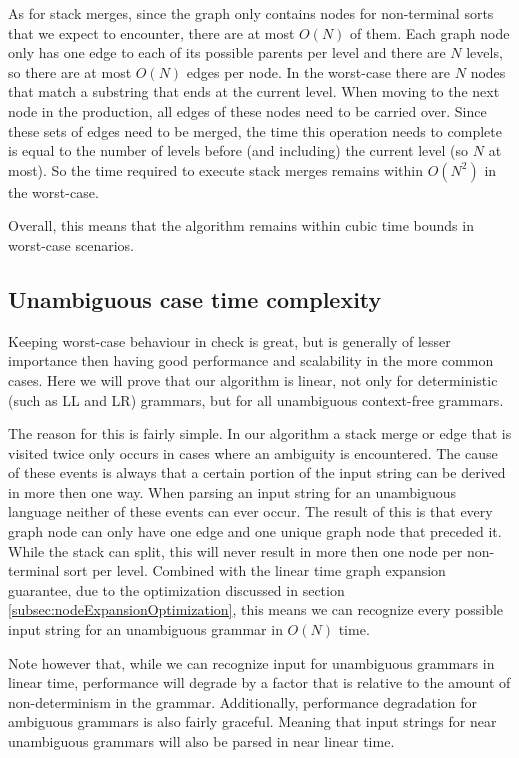 \documentclass[a4paper,10pt]{article}
\begin{document}
As for stack merges, since the graph only contains nodes for non-terminal sorts that we expect to encounter, there are at most $O(N)$ of them. Each graph node only has one edge to each of its possible parents per level and there are $N$ levels, so there are at most $O(N)$ edges per node. In the worst-case there are $N$ nodes that match a substring that ends at the current level. When moving to the next node in the production, all edges of these nodes need to be carried over. Since these sets of edges need to be merged, the time this operation needs to complete is equal to the number of levels before (and including) the current level (so $N$ at most). So the time required to execute stack merges remains within $O(N^2)$ in the worst-case.

Overall, this means that the algorithm remains within cubic time bounds in worst-case scenarios.

\subsection{Unambiguous case time complexity}
\label{subsec:unambiguousTimeComplexity}

Keeping worst-case behaviour in check is great, but is generally of lesser importance then having good performance and scalability in the more common cases. Here we will prove that our algorithm is linear, not only for deterministic (such as LL and LR) grammars, but for all unambiguous context-free grammars.

The reason for this is fairly simple. In our algorithm a stack merge or edge that is visited twice only occurs in cases where an ambiguity is encountered. The cause of these events is always that a certain portion of the input string can be derived in more then one way. When parsing an input string for an unambiguous language neither of these events can ever occur. The result of this is that every graph node can only have one edge and one unique graph node that preceded it. While the stack can split, this will never result in more then one node per non-terminal sort per level. Combined with the linear time graph expansion guarantee, due to the optimization discussed in section \ref{subsec:nodeExpansionOptimization}, this means we can recognize every possible input string for an unambiguous grammar in $O(N)$ time.

Note however that, while we can recognize input for unambiguous grammars in linear time, performance will degrade by a factor that is relative to the amount of non-determinism in the grammar. Additionally, performance degradation for ambiguous grammars is also fairly graceful. Meaning that input strings for near unambiguous grammars will also be parsed in near linear time.
\end{document}
